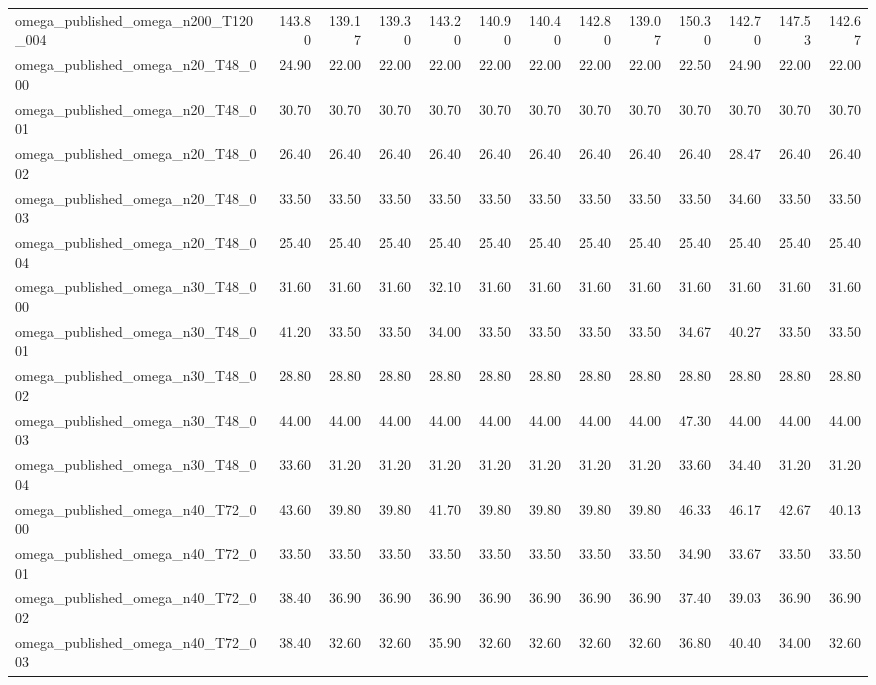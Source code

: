 \begin{table}[htbp]
\begin{tabular}{lrrrrrrrrrrrr}
omega\_published\_omega\_n200\_T120\_004 & 143.80 & 139.17 & 139.30 & 143.20 & 140.90 & 140.40 & 142.80 & 139.07 & 150.30 & 142.70 & 147.53 & 142.67 \\
omega\_published\_omega\_n20\_T48\_000 & 24.90 & 22.00 & 22.00 & 22.00 & 22.00 & 22.00 & 22.00 & 22.00 & 22.50 & 24.90 & 22.00 & 22.00 \\
omega\_published\_omega\_n20\_T48\_001 & 30.70 & 30.70 & 30.70 & 30.70 & 30.70 & 30.70 & 30.70 & 30.70 & 30.70 & 30.70 & 30.70 & 30.70 \\
omega\_published\_omega\_n20\_T48\_002 & 26.40 & 26.40 & 26.40 & 26.40 & 26.40 & 26.40 & 26.40 & 26.40 & 26.40 & 28.47 & 26.40 & 26.40 \\
omega\_published\_omega\_n20\_T48\_003 & 33.50 & 33.50 & 33.50 & 33.50 & 33.50 & 33.50 & 33.50 & 33.50 & 33.50 & 34.60 & 33.50 & 33.50 \\
omega\_published\_omega\_n20\_T48\_004 & 25.40 & 25.40 & 25.40 & 25.40 & 25.40 & 25.40 & 25.40 & 25.40 & 25.40 & 25.40 & 25.40 & 25.40 \\
omega\_published\_omega\_n30\_T48\_000 & 31.60 & 31.60 & 31.60 & 32.10 & 31.60 & 31.60 & 31.60 & 31.60 & 31.60 & 31.60 & 31.60 & 31.60 \\
omega\_published\_omega\_n30\_T48\_001 & 41.20 & 33.50 & 33.50 & 34.00 & 33.50 & 33.50 & 33.50 & 33.50 & 34.67 & 40.27 & 33.50 & 33.50 \\
omega\_published\_omega\_n30\_T48\_002 & 28.80 & 28.80 & 28.80 & 28.80 & 28.80 & 28.80 & 28.80 & 28.80 & 28.80 & 28.80 & 28.80 & 28.80 \\
omega\_published\_omega\_n30\_T48\_003 & 44.00 & 44.00 & 44.00 & 44.00 & 44.00 & 44.00 & 44.00 & 44.00 & 47.30 & 44.00 & 44.00 & 44.00 \\
omega\_published\_omega\_n30\_T48\_004 & 33.60 & 31.20 & 31.20 & 31.20 & 31.20 & 31.20 & 31.20 & 31.20 & 33.60 & 34.40 & 31.20 & 31.20 \\
omega\_published\_omega\_n40\_T72\_000 & 43.60 & 39.80 & 39.80 & 41.70 & 39.80 & 39.80 & 39.80 & 39.80 & 46.33 & 46.17 & 42.67 & 40.13 \\
omega\_published\_omega\_n40\_T72\_001 & 33.50 & 33.50 & 33.50 & 33.50 & 33.50 & 33.50 & 33.50 & 33.50 & 34.90 & 33.67 & 33.50 & 33.50 \\
omega\_published\_omega\_n40\_T72\_002 & 38.40 & 36.90 & 36.90 & 36.90 & 36.90 & 36.90 & 36.90 & 36.90 & 37.40 & 39.03 & 36.90 & 36.90 \\
omega\_published\_omega\_n40\_T72\_003 & 38.40 & 32.60 & 32.60 & 35.90 & 32.60 & 32.60 & 32.60 & 32.60 & 36.80 & 40.40 & 34.00 & 32.60 \\

\end{tabular}
\end{table}
